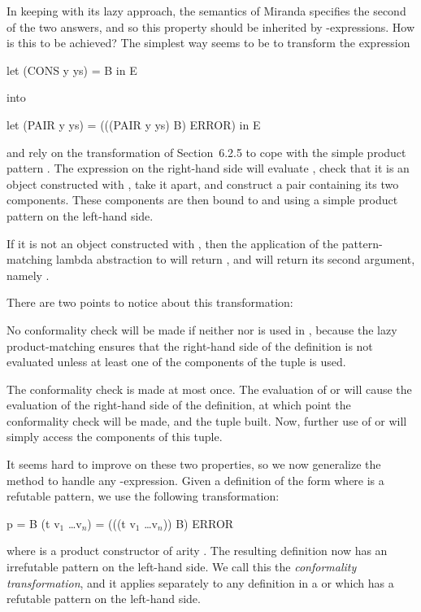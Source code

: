 {In keeping with its lazy approach, the semantics of Miranda specifies the
second of the two answers, and so this property should be inherited by
-expressions. How is this to be achieved? The simplest way seems to be
to transform the expression
\begin{mlcoded}
let (CONS y ys) = B in E
\end{mlcoded}
into
\begin{mlcoded}
		let (PAIR y ys) = (((PAIR y ys) B) \fatbar{} ERROR) in E
\end{mlcoded}
and rely on the transformation of Section~6.2.5 to cope with the simple product
pattern . The expression on the right-hand side will evaluate , check
that it is an object constructed with , take it apart, and construct a pair
containing its two components. These components are then bound to  and  using
a simple product pattern on the left-hand side.

If it is not an object constructed with , then the application of the
pattern-matching lambda abstraction to  will return , and  will return its
second argument, namely .

There are two points to notice about this transformation:
\begin{numbered}
	\item No conformality check will be made if neither  nor  is used in ,
	because the lazy product-matching ensures that the right-hand side of the
	definition is not evaluated unless at least one of the components of the
	tuple is used.
	\item The conformality check is made at most once. The evaluation of  or 
	will cause the evaluation of the right-hand side of the definition, at which
	point the conformality check will be made, and the tuple built. Now,
	further use of  or  will simply access the components of this tuple.
\end{numbered}

It seems hard to improve on these two properties, so we now generalize the
method to handle any -expression. Given a definition of the form
where  is a refutable pattern, we use the following transformation:
\begin{mlcoded}
p = B \equivalent (t v$_1$ \ldots v$_n$) = (((t v$_1$ \ldots v$_n$)) B) \fatbar{} ERROR
\end{mlcoded}
where  is a product constructor of arity . The resulting definition now has an
irrefutable pattern on the left-hand side. We call this the \textit{conformality
transformation}, and it applies separately to any definition in a  or 
which has a refutable pattern on the left-hand side.

}
